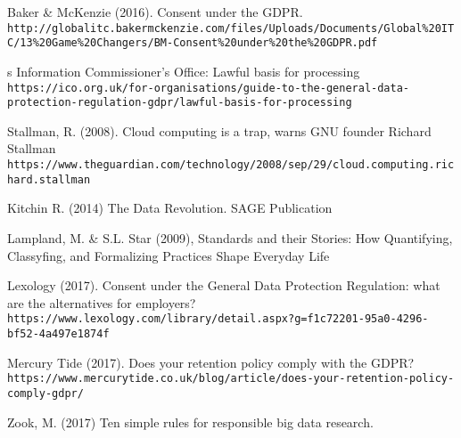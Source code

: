 \documentclass[format=acmsmall, review=false, screen=true]{acmart}
\begin{document}
\newpage
\begin{thebibliography}{9}
Baker \& McKenzie (2016). Consent under the GDPR.
\\\texttt{http://globalitc.bakermckenzie.com/files/Uploads/Documents/Global\%20ITC/13\%20Game\%20Changers/BM-Consent\%20under\%20the\%20GDPR.pdf}
 
 s
Information Commissioner’s Office: Lawful basis for processing
\\\texttt{https://ico.org.uk/for-organisations/guide-to-the-general-data-protection-regulation-gdpr/lawful-basis-for-processing}
 
Stallman, R. (2008). Cloud computing is a trap, warns GNU founder Richard Stallman\\\texttt{https://www.theguardian.com/technology/2008/sep/29/cloud.computing.richard.stallman}

Kitchin R. (2014) The Data Revolution. SAGE Publication

Lampland, M. \& S.L. Star (2009), Standards and their Stories: How Quantifying, Classyfing, and Formalizing Practices Shape Everyday Life

Lexology (2017). Consent under the General Data Protection Regulation: what are the alternatives for employers?
\\\texttt{https://www.lexology.com/library/detail.aspx?g=f1c72201-95a0-4296-bf52-4a497e1874f}

Mercury Tide (2017). Does your retention policy comply with the GDPR?
\\\texttt{https://www.mercurytide.co.uk/blog/article/does-your-retention-policy-comply-gdpr/}

Zook, M. (2017) Ten simple rules for responsible big data research.

\end{thebibliography}
\end{document}

